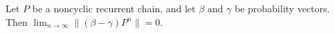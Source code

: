 Let $P$ be a noncyclic recurrent chain, and let $\beta$ and $\gamma$ be probability vectors. Then $\lim_{n \to \infty} \|(\beta - \gamma)P^n\| = 0$.
